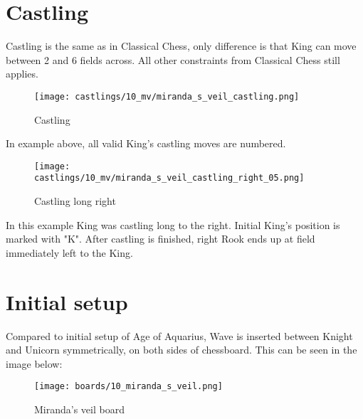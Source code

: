 \section*{Castling}

Castling is the same as in Classical Chess, only difference is that King can move between 2 and 6 fields across.
All other constraints from Classical Chess still applies.

\noindent
\begin{figure}[!h]
\texttt{[image: castlings/10\_mv/miranda\_s\_veil\_castling.png]}
\caption{Castling}
\label{fig:miranda_s_veil_castling}
\end{figure}

In example above, all valid King's castling moves are numbered.

\noindent
\begin{figure}[!h]
\texttt{[image: castlings/10\_mv/miranda\_s\_veil\_castling\_right\_05.png]}
\caption{Castling long right}
\label{fig:miranda_s_veil_castling_right_05}
\end{figure}

In this example King was castling long to the right. Initial King's position is marked with "K".
After castling is finished, right Rook ends up at field immediately left to the King.

\clearpage %

\section*{Initial setup}

Compared to initial setup of Age of Aquarius, Wave is inserted between Knight and Unicorn
symmetrically, on both sides of chessboard. This can be seen in the image below:

\noindent
\begin{figure}[h]
\texttt{[image: boards/10\_miranda\_s\_veil.png]}
\caption{Miranda's veil board}
\label{fig:10_miranda_s_veil}
\end{figure}

\clearpage %
